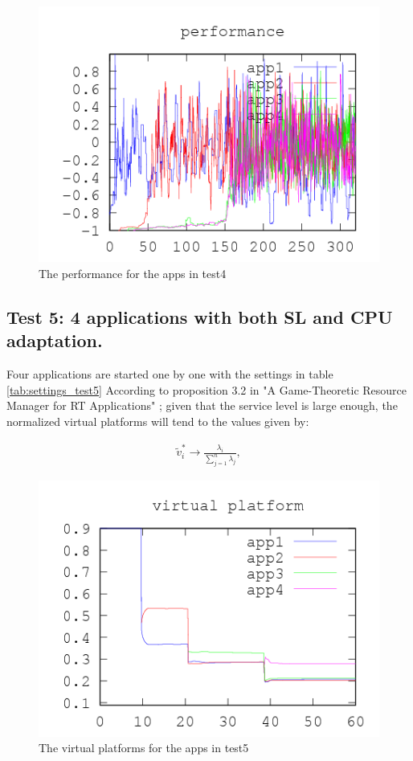\documentclass[nobiblatex]{LTHthesis}
\newcommand{\tv}{\tilde{v}}
\begin{document}
\begin{figure}[!H]
  \centering
  \includegraphics{"tools/plot/logs/test4/f"}
  \caption{The performance for the apps in test4}
  \label{fig:test4_f}
\end{figure}

\clearpage

\subsection{Test 5: 4 applications with both SL and CPU adaptation.}
Four applications are started one by one with the settings in table \ref{tab:settings_test5}
According to proposition 3.2 in "A Game-Theoretic Resource Manager for RT Applications" \cite{gtrm};
given that the service level is large enough, the normalized virtual platforms will tend to the values given by:


  \begin{eqnarray}	\label{eq:SpecialStationaryPoint}
    \tv_i^* \to \frac{\lambda_i}{\sum_{j=1}^{n}\lambda_j},
  \end{eqnarray}


\begin{figure}[!H]
  \centering
  \includegraphics{"tools/plot/logs/test5/vp"}
  \caption{The virtual platforms for the apps in test5}
  \label{fig:test5_vp}
\end{figure}
\end{document}
